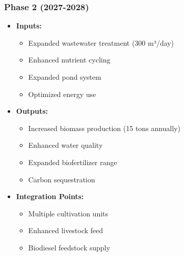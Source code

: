 \subsubsection{Phase 2 (2027-2028)}
\begin{itemize}
    \item \textbf{Inputs:}
    \begin{itemize}
        \item Expanded wastewater treatment (300 m³/day)
        \item Enhanced nutrient cycling
        \item Expanded pond system
        \item Optimized energy use
    \end{itemize}
    \item \textbf{Outputs:}
    \begin{itemize}
        \item Increased biomass production (15 tons annually)
        \item Enhanced water quality
        \item Expanded biofertilizer range
        \item Carbon sequestration
    \end{itemize}
    \item \textbf{Integration Points:}
    \begin{itemize}
        \item Multiple cultivation units
        \item Enhanced livestock feed
        \item Biodiesel feedstock supply
    \end{itemize}
\end{itemize}

